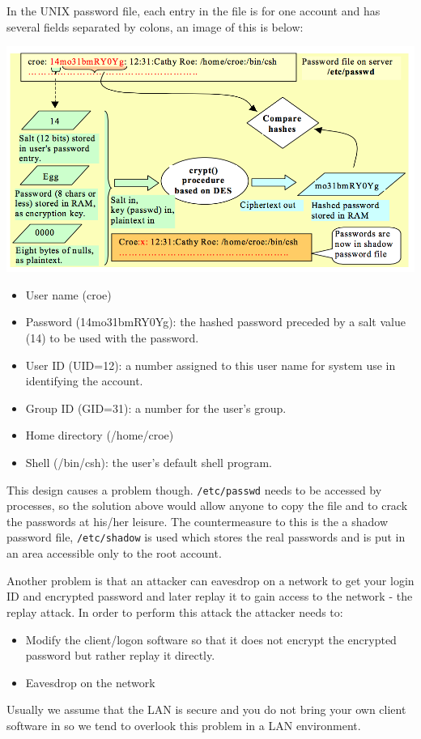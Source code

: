 \documentclass{article}
\begin{document}
In the UNIX password file, each entry in the file is for one account and has several fields separated by colons, an image of this is below:
\begin{center}
  \includegraphics[scale=0.6]{unix-pass.png}
\end{center}
\begin{itemize}
  \item User name (croe)
  \item Password (14mo31bmRY0Yg): the hashed password preceded by a salt value (14) to be used with the password.
  \item User ID (UID=12): a number assigned to this user name for system use in identifying the account.
  \item Group ID (GID=31): a number for the user's group.
  \item Home directory (/home/croe)
  \item Shell (/bin/csh): the user's default shell program.
\end{itemize}
This design causes a problem though. \texttt{/etc/passwd} needs to be accessed by processes, so the solution above would allow anyone to copy the file and to crack the passwords at his/her leisure. The countermeasure to this is the a shadow password file, \texttt{/etc/shadow} is used which stores the real passwords and is put in an area accessible only to the root account.

Another problem is that an attacker can eavesdrop on a network to get your login ID and encrypted password and later replay it to gain access to the network - the replay attack. In order to perform this attack the attacker needs to:
\begin{itemize}
  \item Modify the client/logon software so that it does not encrypt the encrypted password but rather replay it directly.
  \item Eavesdrop on the network
\end{itemize}
Usually we assume that the LAN is secure and you do not bring your own client software in so we tend to overlook this problem in a LAN environment.
\end{document}

